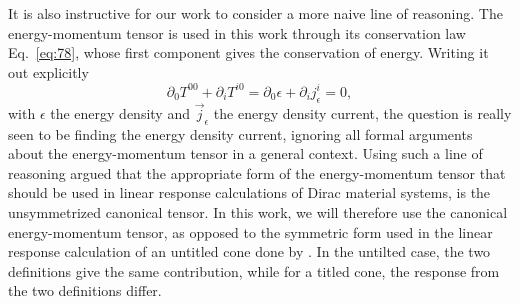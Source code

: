It is also instructive for our work to consider a more naive line of reasoning.
The energy-momentum tensor is used in this work through its conservation law Eq.~\eqref{eq:78}, whose first component gives the conservation of energy.
Writing it out explicitly
\begin{equation}
  \label{eq:84}
  \partial_0T^{00} + \partial_i T^{i0} = \partial_0 \epsilon + \partial_i j^i_{\epsilon} = 0,
\end{equation}
with \( \epsilon \) the energy density and \( \vec{j}_{\epsilon} \) the energy density current, the question is really seen to be finding the energy density current, ignoring all formal arguments about the energy-momentum tensor in a general context.
Using such a line of reasoning \textcite{vanderwurffMagnetovorticalThermoelectricTransport2019} argued that the appropriate form of the energy-momentum tensor that should be used in linear response calculations of Dirac material systems, is the unsymmetrized canonical tensor.
In this work, we will therefore use the canonical energy-momentum tensor, as opposed to the symmetric form used in the linear response calculation of an untitled cone done by \textcite{arjonaFingerprintsConformalAnomaly2019}.
In the untilted case, the two definitions give the same contribution, while for a titled cone, the response from the two definitions differ.

